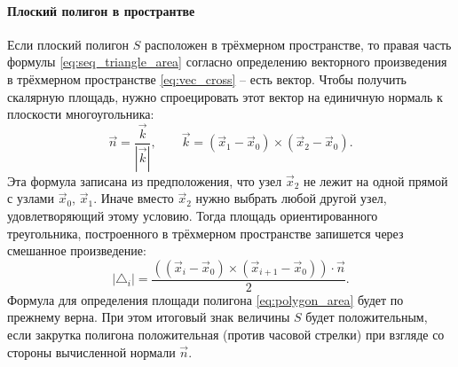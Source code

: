 \paragraph{Плоский полигон в пространтве} Если плоский полигон $S$ расположен в трёхмерном пространстве,
то правая часть формулы \cref{eq:seq_triangle_area} согласно определению векторного произведения в трёхмерном пространстве \cref{eq:vec_cross}
-- есть вектор.
Чтобы получить скалярную площадь, нужно спроецировать этот вектор на единичную нормаль к плоскости
многоугольника:
$$
\vec n = \frac{\vec k}{|\vec k|}, \qquad \vec k = (\vec x_1 - \vec x_0) \times (\vec x_2 - \vec x_0).
$$
Эта формула записана из предположения, что узел $\vec x_2$ не лежит
на одной прямой с узлами $\vec x_0$, $\vec x_1$. Иначе вместо $\vec x_2$ нужно
выбрать любой другой узел, удовлетворяющий этому условию.
Тогда площадь ориентированного треугольника, построенного
в трёхмерном пространстве запишется через смешанное произведение:
\begin{equation}
\label{eq:seq_triangle_area_3d}
|\triangle_i| = \frac{\left((\vec x_i - \vec x_0) \times (\vec x_{i+1} - \vec x_0) \right)\cdot \vec n}{2}.
\end{equation}
Формула для определения площади полигона \cref{eq:polygon_area} будет по прежнему верна.
При этом итоговый знак величины $S$ будет положительным,
если закрутка полигона положительная (против часовой стрелки) при взгляде со стороны
вычисленной нормали $\vec n$.

